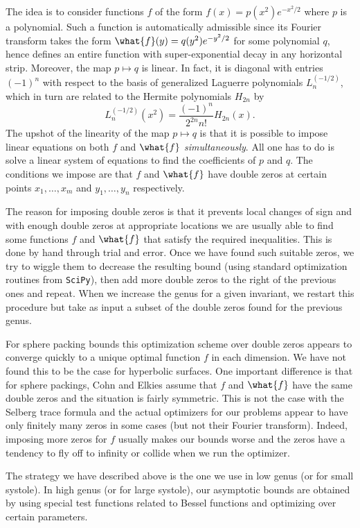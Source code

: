 \documentclass[12pt]{amsart}
\numberwithin{equation}{section}
\begin{document}
The idea is to consider functions $f$ of the form $f(x) = p(x^2) e^{-x^2/2}$ where $p$ is a polynomial. Such a function is automatically admissible since its Fourier transform takes the form $\what{f}(y)=q(y^2) e^{-y^2/2}$ for some polynomial $q$, hence defines an entire function with super-exponential decay in any horizontal strip. Moreover, the map $p \mapsto q$ is linear. In fact, it is diagonal with entries $(-1)^n$ with respect to the basis of generalized Laguerre polynomials $L_n^{(-1/2)}$, which in turn are related to the Hermite polynomials $H_{2n}$ by
\[
L_n^{(-1/2)}(x^2) = \frac{(-1)^n}{2^{2n} n!}H_{2n}(x).
\]
The upshot of the linearity of the map $p\mapsto q$ is that it is possible to impose linear equations on both $f$ and $\what{f}$ \emph{simultaneously}. All one has to do is solve a linear system of equations to find the coefficients of $p$ and $q$. The conditions we impose are that $f$ and $\what{f}$ have double zeros at certain points $x_1,\ldots , x_m$ and $y_1,\ldots,y_n$ respectively.

The reason for imposing double zeros is that it prevents local changes of sign and with enough double zeros at appropriate locations we are usually able to find some functions $f$ and $\what{f}$ that satisfy the required inequalities. This is done by hand through trial and error. Once we have found such suitable zeros, we try to wiggle them to decrease the resulting bound  (using standard optimization routines from \texttt{SciPy}), then add more double zeros to the right of the previous ones and repeat. When we increase the genus for a given invariant, we restart this procedure but take as input a subset of the double zeros found for the previous genus. 

For sphere packing bounds this optimization scheme over double zeros appears to converge quickly to a unique optimal function $f$ in each dimension. We have not found this to be the case for hyperbolic surfaces. One important difference is that for sphere packings, Cohn and Elkies assume that $f$ and $\what{f}$ have the same double zeros and the situation is fairly symmetric. This is not the case with the Selberg trace formula and the actual optimizers for our problems appear to have only finitely many zeros in some cases (but not their Fourier transform). Indeed, imposing more zeros for $f$ usually makes our bounds worse and the zeros have a tendency to fly off to infinity or collide when we run the optimizer.

The strategy we have described above is the one we use in low genus (or for small systole). In high genus (or for large systole), our asymptotic bounds are obtained by using special test functions related to Bessel functions and optimizing over certain parameters.
\end{document}
